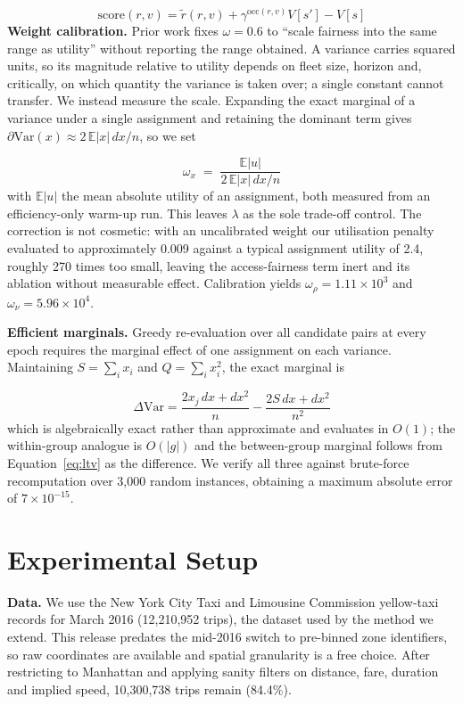 \documentclass[10pt,twocolumn]{article}
\begin{document}
\begin{equation}\label{eq:score}
\mathrm{score}(r,v) = \tilde{r}(r,v) + \gamma^{\mathrm{occ}(r,v)} V[s'] - V[s]
\end{equation}
\textbf{Weight calibration.} Prior work fixes \(\omega = 0.6\) to ``scale fairness into the same range as utility'' without reporting the range obtained. A variance carries squared units, so its magnitude relative to utility depends on fleet size, horizon and, critically, on which quantity the variance is taken over; a single constant cannot transfer. We instead measure the scale. Expanding the exact marginal of a variance under a single assignment and retaining the dominant term gives \(\partial \mathrm{Var}(x) \approx 2\,\mathbb{E}|x|\,dx/n\), so we set

\begin{equation}\label{eq:omega}
\omega_x \;=\; \frac{\mathbb{E}|u|}{2\,\mathbb{E}|x|\,dx/n}
\end{equation}
with \(\mathbb{E}|u|\) the mean absolute utility of an assignment, both measured from an efficiency-only warm-up run. This leaves \(\lambda\) as the sole trade-off control. The correction is not cosmetic: with an uncalibrated weight our utilisation penalty evaluated to approximately 0.009 against a typical assignment utility of 2.4, roughly 270 times too small, leaving the access-fairness term inert and its ablation without measurable effect. Calibration yields \(\omega_\rho = 1.11\times10^{3}\) and \(\omega_\nu = 5.96\times10^{4}\).

\textbf{Efficient marginals.} Greedy re-evaluation over all candidate pairs at every epoch requires the marginal effect of one assignment on each variance. Maintaining \(S=\sum_i x_i\) and \(Q=\sum_i x_i^2\), the exact marginal is

\begin{equation}\label{eq:marginal}
\Delta\mathrm{Var} = \frac{2x_j\,dx + dx^2}{n} - \frac{2S\,dx + dx^2}{n^2}
\end{equation}
which is algebraically exact rather than approximate and evaluates in \(O(1)\); the within-group analogue is \(O(|g|)\) and the between-group marginal follows from Equation~\ref{eq:ltv} as the difference. We verify all three against brute-force recomputation over 3{,}000 random instances, obtaining a maximum absolute error of \(7 \times 10^{-15}\).

\section{Experimental Setup}
\textbf{Data.} We use the New York City Taxi and Limousine Commission yellow-taxi records for March 2016 \cite{tlc} (12{,}210{,}952 trips), the dataset used by the method we extend. This release predates the mid-2016 switch to pre-binned zone identifiers, so raw coordinates are available and spatial granularity is a free choice. After restricting to Manhattan and applying sanity filters on distance, fare, duration and implied speed, 10{,}300{,}738 trips remain (84.4\%).
\end{document}

